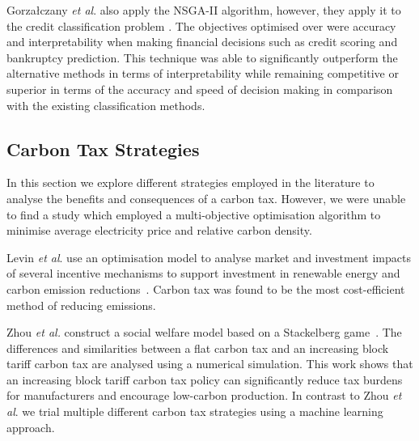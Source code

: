 \documentclass[sigconf]{acmart}
\begin{document}
Gorza\l{}czany \textit{et al}. also apply the NSGA-II algorithm, however, they apply it to the credit classification problem \cite{Gorzaczany2016}. The objectives optimised over were accuracy and interpretability when making financial decisions such as credit scoring and bankruptcy prediction. This technique was able to significantly outperform the alternative methods in terms of interpretability while remaining competitive or superior in terms of the accuracy and speed of decision making in comparison with the existing classification methods.



\subsection{Carbon Tax Strategies}

In this section we explore different strategies employed in the literature to analyse the benefits and consequences of a carbon tax. However, we were unable to find a study which employed a multi-objective optimisation algorithm to minimise average electricity price and relative carbon density.

Levin \textit{et al}. use an optimisation model to analyse market and investment impacts of several incentive mechanisms to support investment in renewable energy and carbon emission reductions~\cite{Levin2019}. Carbon tax  was found to be the most cost-efficient method of reducing emissions.

Zhou \textit{et al.} construct a social welfare model based on a Stackelberg game~\cite{Zhou2019}. The differences and similarities between a flat carbon tax and an increasing block tariff carbon tax are analysed using a numerical simulation. This work shows that an increasing block tariff carbon tax policy can significantly reduce tax burdens for manufacturers and encourage low-carbon production. In contrast to Zhou \textit{et al}. we trial multiple different carbon tax strategies using a machine learning approach. 
\end{document}
